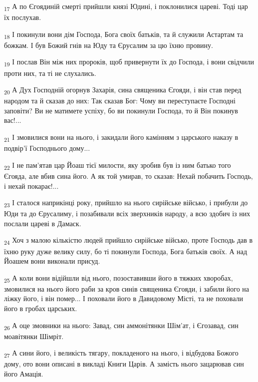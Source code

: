 \begin{tcolorbox}
\textsubscript{17} А по Єгоядиній смерті прийшли князі Юдині, і поклонилися цареві. Тоді цар їх послухав.
\end{tcolorbox}
\begin{tcolorbox}
\textsubscript{18} І покинули вони дім Господа, Бога своїх батьків, та й служили Астартам та божкам. І був Божий гнів на Юду та Єрусалим за цю їхню провину.
\end{tcolorbox}
\begin{tcolorbox}
\textsubscript{19} І послав Він між них пророків, щоб привернути їх до Господа, і вони свідчили проти них, та ті не слухались.
\end{tcolorbox}
\begin{tcolorbox}
\textsubscript{20} А Дух Господній огорнув Захарія, сина священика Єгояди, і він став перед народом та й сказав до них: Так сказав Бог: Чому ви переступаєте Господні заповіти? Ви не матимете успіху, бо ви покинули Господа, то й Він покинув вас!...
\end{tcolorbox}
\begin{tcolorbox}
\textsubscript{21} І змовилися вони на нього, і закидали його камінням з царського наказу в подвір'ї Господнього дому...
\end{tcolorbox}
\begin{tcolorbox}
\textsubscript{22} І не пам'ятав цар Йоаш тієї милости, яку зробив був із ним батько того Єгояда, але вбив сина його. А як той умирав, то сказав: Нехай побачить Господь, і нехай покарає!...
\end{tcolorbox}
\begin{tcolorbox}
\textsubscript{23} І сталося наприкінці року, прийшло на нього сирійське військо, і прибули до Юди та до Єрусалиму, і позабивали всіх зверхників народу, а всю здобич із них послали цареві в Дамаск.
\end{tcolorbox}
\begin{tcolorbox}
\textsubscript{24} Хоч з малою кількістю людей прийшло сирійське військо, проте Господь дав в їхню руку дуже велику силу, бо ті покинули Господа, Бога батьків своїх. А над Йоашем вони виконали присуд.
\end{tcolorbox}
\begin{tcolorbox}
\textsubscript{25} А коли вони відійшли від нього, позоставивши його в тяжких хворобах, змовилися на нього його раби за кров синів священика Єгояди, і забили його на ліжку його, і він помер... І поховали його в Давидовому Місті, та не поховали його в гробах царських.
\end{tcolorbox}
\begin{tcolorbox}
\textsubscript{26} А оце змовники на нього: Завад, син аммонітянки Шім'ат, і Єгозавад, син моавітянки Шімріт.
\end{tcolorbox}
\begin{tcolorbox}
\textsubscript{27} А сини його, і великість тягару, покладеного на нього, і відбудова Божого дому, ото вони описані в викладі Книги Царів. А замість нього зацарював син його Амація.
\end{tcolorbox}

